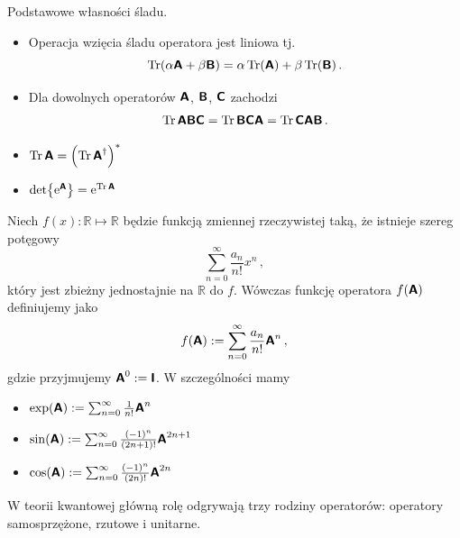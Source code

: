 \documentclass{myclass}
\begin{document}
\begin{theorem} Podstawowe własności śladu.
\begin{itemize}
    \item Operacja wzięcia śladu operatora jest liniowa tj. 
    \begin{equation*}
        \Trace(\alpha\oper{A} + \beta\oper{B}) = \alpha\Trace(\oper{A}) + \beta\Trace(\oper{B})\,.
    \end{equation*}

    \item Dla dowolnych operatorów \(\boldsymbol{\mathsf{A}}\), \(\boldsymbol{\mathsf{B}}\), \(\boldsymbol{\mathsf{C}}\) zachodzi
    \begin{equation*}
        \Trace{\oper{ABC}} = \Trace{\oper{BCA}} = \Trace{\oper{CAB}}\,.
    \end{equation*}

    \item \(\Trace{\oper{A}} = \left(\Trace{\oper{A}^\dagger}\right)^*\)
    \item \(\det{\e^{\oper{A}}} = \e^{\Trace{\oper{A}}}\)
\end{itemize}  
\end{theorem}

\begin{definition}
Niech \(f(x):\mathbb{R}\mapsto\mathbb{R}\) będzie funkcją zmiennej rzeczywistej taką, że istnieje
szereg potęgowy
\begin{equation*}
\sum_{n=0}^\infty\frac{a_n}{n!}x^n\,,
\end{equation*}
który jest zbieżny jednostajnie na \(\mathbb{R}\) do \(f\). Wówczas funkcję operatora
\(f(\boldsymbol{\mathsf{A}})\) definiujemy jako
\begin{equation*}
f(\boldsymbol{\mathsf{A}}) := \sum_{n=0}^\infty \frac{a_n}{n!}\boldsymbol{\mathsf{A}}^n\,,
\end{equation*}
gdzie przyjmujemy \(\boldsymbol{\mathsf{A}}^0 := \boldsymbol{\mathsf{I}}\). W szczególności mamy
\begin{itemize}
    \item \(\exp(\boldsymbol{\mathsf{A}}) := \sum_{n=0}^\infty \frac{1}{n!}\boldsymbol{\mathsf{A}}^n\)

    \item \(\sin(\boldsymbol{\mathsf{A}}) := \sum_{n=0}^\infty \frac{(-1)^n}{(2n+1)!}\boldsymbol{\mathsf{A}}^{2n+1}\)

    \item \(\cos(\boldsymbol{\mathsf{A}}) := \sum_{n=0}^\infty \frac{(-1)^n}{(2n)!}\boldsymbol{\mathsf{A}}^{2n}\)
\end{itemize}
\end{definition}

W teorii kwantowej główną rolę odgrywają trzy rodziny operatorów: operatory samosprzężone, rzutowe i
unitarne.
\end{document}
